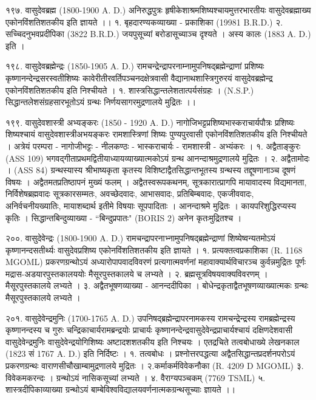 १९७. वासुदेवब्रह्म (1800-1900 A. D.)
अनिरुद्धपुत्रः हृषीकेशाश्रमशिष्यश्चायमुत्तरभारतीयः वासुदेवब्रह्माख्य एकोनविंशतिशतकीय इति ज्ञायते ।।
१. बृहदारण्यकव्याख्या - प्रकाशिका (19981 B.R.D.)
२. सच्चिदनुभवप्रदीपिका (3822 B.R.D.) जयपुसूच्यां बरोडासूच्याञ्च दृश्यते । अस्य कालः (1883 A. D.) इति ।

१९८. वासुदेवब्रह्मेन्द्रः (1850-1905 A. D.)
रामचन्द्रेन्द्रापरनाम्नामुपनिषद्ब्रह्मेन्द्राणां प्रशिष्यः कृष्णानन्देन्द्रसरस्वतीशिष्यः कावेरीतीरवर्तिपञ्चनदक्षेत्रवासी वैद्यानाथशास्त्रिगुरुरयं वासुदेवब्रह्मेन्द्र एकोनविंशतिशतकीय इति निश्चीयते ।
१. शास्त्रसिद्धान्तलेशतात्पर्यसंग्रहः । (N.S.P.) सिद्धान्तलेशसंग्रहसारभूतोऽयं ग्रन्थः निर्णयसागरमुद्रणालये मुद्रितः ।।

१९९. वासुदेवशास्त्री अभ्यङ्करः (1850 - 1920 A. D.)
नागोजिभट्टप्रशिष्यभास्कराचार्यपौत्रः प्रशिष्यः शिष्यश्चायं वासुदेवशास्त्रीअभयङ्करः रामशास्त्रिणां शिष्यः पुण्यपुरवासी एकोनविंशतिशतकीय इति निश्चीयते । अत्रेयं परम्परा - नागोजीभट्टः - नीलकण्ठः - भास्कराचार्यः - रामशास्त्री - अभ्यंकरः ।
१. अद्वैताङ्कुरः (ASS 109) भगवद्गीताप्रथमद्वितीयाध्यायव्याख्यात्मकोऽयं ग्रन्थ आनन्दाश्रमुद्रणालये मुद्रितः ।
२. अद्वैतामोदः । (ASS 84)
ग्रन्थस्यास्य श्रीभाष्यकृता कृतस्य विशिष्टाद्वैतसिद्धान्तभूतस्य ग्रन्थस्य तद्दूषणानाञ्च दूषणं विषयः । अद्वैतमतप्रतिष्ठापनं मुख्यं फलम् । अद्वैतस्वरूपकथनम्, सूत्रकारात्प्रागपि मायावादस्य विद्यमानता, निर्विशेषब्रह्मवादः सूत्रकारसम्मतः, अवच्छेदवादः, आभासवादः, प्रतिबिम्बवादः, एकजीववादः, अनिर्वचनीयख्यातिः, मायाशब्दार्थ इतीमे विषयाः सूपपादिताः । आनन्दाश्रमे मुद्रितः । कायपरिशुद्धिरप्यस्य कृतिः । सिद्धान्तबिन्दुव्याख्या - ``बिन्दुप्रपातः" (BORIS 2) अनेन कृतःमुद्रितश्च ।

२००. वासुदेवेन्द्रः (1800-1900 A. D.)
रामचन्द्रापरनाभ्नामुपनिषद्ब्रह्मेन्द्राणां शिष्येष्वन्यतमोऽयं कृष्णानन्दसतीर्थ्यः वासुदेवप्रशिष्य एकोनविंशतिशतकीय इति ज्ञायते ।
१. प्रत्यक्तत्वप्रकाशिका (R. 1168 MGOML) प्रकरणग्रन्थोऽयं अध्यारोपापवादविवरणं प्रत्यगात्मवर्णनां महावाक्यार्थविचारञ्च कुर्वन्नमुद्रितः पूर्णः मद्रास-अडयारपुस्तकालययोः मैसूरपुस्तकालये च लभ्यते ।
२. ब्रह्मसूत्रविषयवाक्यविवरणम् । मैसूरपुस्तकालये लभ्यते ।
३. अद्वैतभूषणव्याख्या - आनन्ददीपिका । बोधेन्द्रकृताद्वैतभूषणव्याख्यात्मकः ग्रन्थः मैसूरपुस्तकालये लभ्यते ।

२०१. वासुदेवेन्द्रमुनिः (1700-1765 A. D.)
उपनिषद्ब्रह्मेन्द्रापरनामकस्य रामचन्द्रेन्द्रस्य रामब्रह्मेन्द्रस्य कृष्णानन्दस्य च गुरुः चन्द्रिकाचार्यरामब्रन्द्रयोः प्राचार्यः कृष्णानन्देन्द्रवासुदेवेन्द्रप्राचार्यश्चायं दक्षिणदेशवासी वासुदेवेन्द्रमुनिः वासुदेवेन्द्रयोगिशिष्यः अष्टादशशतकीय इति निश्चयः । एतद्रचिते तत्वबोधाख्ये लेखनकाल (1823 सं 1767 A. D.) इति निर्दिष्टः ।
१. तत्वबोधः । प्रश्नोत्तरपद्धत्या अद्वैतसिद्धान्तप्रदर्शनपरोऽयं प्रकरणग्रन्थः वाराणसीचौखाम्बामुद्रणालये मुद्रितः ।
२.कर्माकर्मविवेकनौका (R. 4209 D MGOML)
३. विवेकमकरन्दः । ग्रन्थोऽयं नासिकसूच्यां लभ्यते ।
४. वैराग्यपञ्चकम् (7769 TSML)
५. शास्त्रदीपिकाव्याख्या ग्रन्थोऽयं बाम्बेविश्वविद्यालयवर्णनात्मकग्रन्थसूच्याः ज्ञायते ।।

